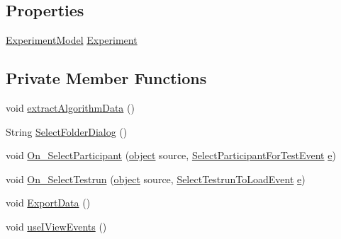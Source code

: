 \subsection*{Properties}
\begin{DoxyCompactItemize}
\item 
\hyperlink{class_web_analyzer_1_1_models_1_1_base_1_1_experiment_model}{Experiment\+Model} \hyperlink{class_web_analyzer_1_1_u_i_1_1_interaction_objects_1_1_analysis_export_control_a951604e49f2e9dfe33ec3cb1d8fdc4fa}{Experiment}
\end{DoxyCompactItemize}
\subsection*{Private Member Functions}
\begin{DoxyCompactItemize}
\item 
void \hyperlink{class_web_analyzer_1_1_u_i_1_1_interaction_objects_1_1_analysis_export_control_a8b17d64f1b1f9992923cb0d15f9b1b18}{extract\+Algorithm\+Data} ()
\item 
String \hyperlink{class_web_analyzer_1_1_u_i_1_1_interaction_objects_1_1_analysis_export_control_ad0c70b4203f88526cb2dc146eae6ac5c}{Select\+Folder\+Dialog} ()
\item 
void \hyperlink{class_web_analyzer_1_1_u_i_1_1_interaction_objects_1_1_analysis_export_control_afa9fed7468d8f513be28ec140f00b308}{On\+\_\+\+Select\+Participant} (\hyperlink{_u_i_2_h_t_m_l_resources_2js_2lib_2underscore_8min_8js_aae18b7515bb2bc4137586506e7c0c903}{object} source, \hyperlink{class_web_analyzer_1_1_events_1_1_select_participant_for_test_event}{Select\+Participant\+For\+Test\+Event} \hyperlink{_u_i_2_h_t_m_l_resources_2js_2lib_2bootstrap_8min_8js_ab5902775854a8b8440bcd25e0fe1c120}{e})
\item 
void \hyperlink{class_web_analyzer_1_1_u_i_1_1_interaction_objects_1_1_analysis_export_control_a3317d4651e2e761dd9a649abd1b5b5e6}{On\+\_\+\+Select\+Testrun} (\hyperlink{_u_i_2_h_t_m_l_resources_2js_2lib_2underscore_8min_8js_aae18b7515bb2bc4137586506e7c0c903}{object} source, \hyperlink{class_web_analyzer_1_1_events_1_1_select_testrun_to_load_event}{Select\+Testrun\+To\+Load\+Event} \hyperlink{_u_i_2_h_t_m_l_resources_2js_2lib_2bootstrap_8min_8js_ab5902775854a8b8440bcd25e0fe1c120}{e})
\item 
void \hyperlink{class_web_analyzer_1_1_u_i_1_1_interaction_objects_1_1_analysis_export_control_a3ff0b8a577ef0ddba09b1f49ff7f4ceb}{Export\+Data} ()
\item 
void \hyperlink{class_web_analyzer_1_1_u_i_1_1_interaction_objects_1_1_analysis_export_control_a3cd03ba6847b807714b4c9b37524a783}{use\+I\+View\+Events} ()
\end{DoxyCompactItemize}
